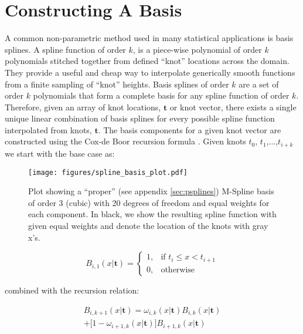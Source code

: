 \section{Constructing A Basis} \label{sec:basis_splines}

A common non-parametric method used in many statistical applications is basis splines. A spline function of order $k$, 
is a piece-wise polynomial of order $k$ polynomials stitched together from defined ``knot'' locations across the domain. 
They provide a useful and cheap way to interpolate generically smooth functions from a finite sampling of ``knot'' heights. 
Basis splines of order $k$ are a set of order $k$ polynomials that form a complete basis for any spline function of order $k$. 
Therefore, given an array of knot locations, $\mathbf{t}$ or knot vector, there exists a single unique linear combination of basis splines 
for every possible spline function interpolated from knots, $\mathbf{t}$. The basis components for a given knot vector are constructed  
using the Cox-de Boor recursion formula \citep{deBoor78}. Given knots $t_0$, $t_1$,...,$t_{i+k}$ we start with the base case as:

\begin{figure}[ht!]
    \begin{centering}
        \texttt{[image: figures/spline\_basis\_plot.pdf]}
        \caption{Plot showing a ``proper'' (see appendix \ref{sec:psplines}) M-Spline basis of order 3 (cubic) with 20 degrees of freedom and equal weights for each component. 
        In black, we show the resulting spline function with given equal weights and denote the location of the knots with gray x's.}
        \label{fig:spline_basis}
    \end{centering}
\end{figure}

\begin{equation}
    B_{i,1}(x | \mathbf{t}) = 
    \begin{cases}
        1, & \text{if } t_i \leq x < t_{i+1} \\
        0, & \text{otherwise}
    \end{cases}
\end{equation}

\noindent combined with the recursion relation:

\begin{multline*}
    B_{i,k+1}(x | \mathbf{t}) = \omega_{i,k}(x | \mathbf{t})B_{i,k}(x | \mathbf{t})\\
                                + \big[1-\omega_{i+1,k}(x | \mathbf{t})\big] B_{i+1,k}(x | \mathbf{t})
\end{multline*}

